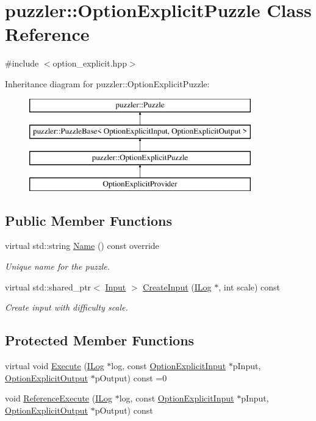 \hypertarget{a00022}{}\section{puzzler\+:\+:Option\+Explicit\+Puzzle Class Reference}
\label{a00022}


{\ttfamily \#include $<$option\+\_\+explicit.\+hpp$>$}

Inheritance diagram for puzzler\+:\+:Option\+Explicit\+Puzzle\+:\begin{figure}[H]
\begin{center}
\leavevmode
\includegraphics[height=4.000000cm]{a00022}
\end{center}
\end{figure}
\subsection*{Public Member Functions}
\begin{DoxyCompactItemize}
\item 
virtual std\+::string \hyperlink{a00022_a91ce85ad775e8eb8a20cf0df4ce2efcd}{Name} () const override
\begin{DoxyCompactList}\small\item\em Unique name for the puzzle. \end{DoxyCompactList}\item 
virtual std\+::shared\+\_\+ptr$<$ \hyperlink{a00009}{Input} $>$ \hyperlink{a00022_a39ec41d191512d89f6baffd9a266a603}{Create\+Input} (\hyperlink{a00008}{I\+Log} $\ast$, int scale) const 
\begin{DoxyCompactList}\small\item\em Create input with difficulty scale. \end{DoxyCompactList}\end{DoxyCompactItemize}
\subsection*{Protected Member Functions}
\begin{DoxyCompactItemize}
\item 
virtual void \hyperlink{a00022_a98dc91a216de079b4caaee21b6e1f6e0}{Execute} (\hyperlink{a00008}{I\+Log} $\ast$log, const \hyperlink{a00019}{Option\+Explicit\+Input} $\ast$p\+Input, \hyperlink{a00020}{Option\+Explicit\+Output} $\ast$p\+Output) const =0
\item 
void \hyperlink{a00022_a0cd401a385d8bf341468a76890460911}{Reference\+Execute} (\hyperlink{a00008}{I\+Log} $\ast$log, const \hyperlink{a00019}{Option\+Explicit\+Input} $\ast$p\+Input, \hyperlink{a00020}{Option\+Explicit\+Output} $\ast$p\+Output) const 
\end{DoxyCompactItemize}


